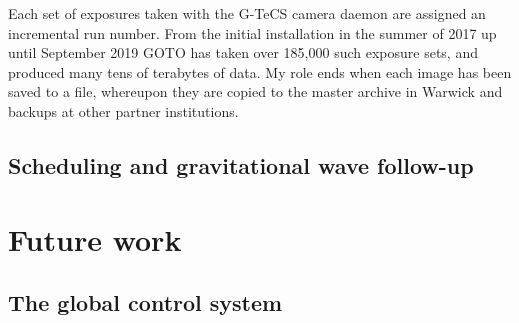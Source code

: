 \begin{colsection}
\begin{colsection}
Each set of exposures taken with the G-TeCS camera daemon are assigned an incremental run number. From the initial installation in the summer of 2017 up until September 2019 GOTO has taken over 185,000 such exposure sets, and produced many tens of terabytes of data. My role ends when each image has been saved to a file, whereupon they are copied to the master archive in Warwick and backups at other partner institutions.

\end{colsection}

\newpage
\subsection{Scheduling and gravitational wave follow-up}
\label{sec:gw_results}
\begin{colsection}


\end{colsection}


\end{colsection}


\newpage
\section{Future work}
\label{sec:future}
\begin{colsection}


\begin{colsection}

\citep{GW150914, GW150914_followup, GW151226}

\end{colsection}


\subsection{The global control system}
\label{sec:gtecs_multisite}
\begin{colsection}


\end{colsection}


\end{colsection}

